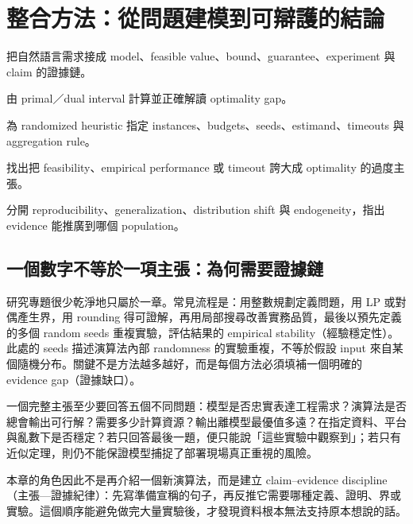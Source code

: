 \documentclass[11pt,a4paper,oneside,openany]{book}
\begin{document}
\chapter{整合方法：從問題建模到可辯護的結論}
\label{ch:synthesis}
\begin{chaptermastery}
\item 把自然語言需求接成 model、feasible value、bound、guarantee、experiment 與 claim 的證據鏈。
\item 由 primal／dual interval 計算並正確解讀 optimality gap。
\item 為 randomized heuristic 指定 instances、budgets、seeds、estimand、timeouts 與 aggregation rule。
\item 找出把 feasibility、empirical performance 或 timeout 誇大成 optimality 的過度主張。
\item 分開 reproducibility、generalization、distribution shift 與 endogeneity，指出 evidence 能推廣到哪個 population。
\end{chaptermastery}

\section{一個數字不等於一項主張：為何需要證據鏈}
研究專題很少乾淨地只屬於一章。常見流程是：用整數規劃定義問題，用 LP 或對偶產生界，用 rounding 得可證解，再用局部搜尋改善實務品質，最後以預先定義的多個 random seeds 重複實驗，評估結果的 empirical stability（經驗穩定性）。此處的 seeds 描述演算法內部 randomness 的實驗重複，不等於假設 input 來自某個隨機分布。關鍵不是方法越多越好，而是每個方法必須填補一個明確的 evidence gap（證據缺口）。

一個完整主張至少要回答五個不同問題：模型是否忠實表達工程需求？演算法是否總會輸出可行解？需要多少計算資源？輸出離模型最優值多遠？在指定資料、平台與亂數下是否穩定？若只回答最後一題，便只能說「這些實驗中觀察到」；若只有近似定理，則仍不能保證模型捕捉了部署現場真正重視的風險。

本章的角色因此不是再介紹一個新演算法，而是建立 claim--evidence discipline（主張—證據紀律）：先寫準備宣稱的句子，再反推它需要哪種定義、證明、界或實驗。這個順序能避免做完大量實驗後，才發現資料根本無法支持原本想說的話。
\end{document}
